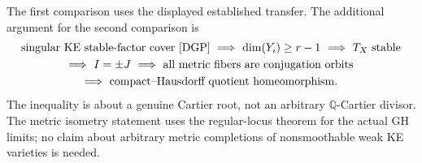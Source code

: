\documentclass[11pt]{article}
\newcommand{\Q}{\mathbb Q}
\begin{document}
The first comparison uses the displayed established transfer. The
additional argument for the second comparison is
\[
\begin{gathered}
\text{singular KE stable-factor cover \cite{DGP}}
\ \Longrightarrow\
\dim(Y_i)\geq r-1\ \Longrightarrow\ T_X\text{ stable}\\
\Longrightarrow\ I=\pm J
\ \Longrightarrow\
\text{all metric fibers are conjugation orbits}\\
\Longrightarrow\
\text{compact--Hausdorff quotient homeomorphism}.
\end{gathered}
\]
The inequality is about a genuine Cartier root, not an arbitrary
$\Q$-Cartier divisor. The metric isometry statement uses the regular-locus
theorem for the actual GH limits; no claim about arbitrary metric
completions of nonsmoothable weak KE varieties is needed.
\end{document}

